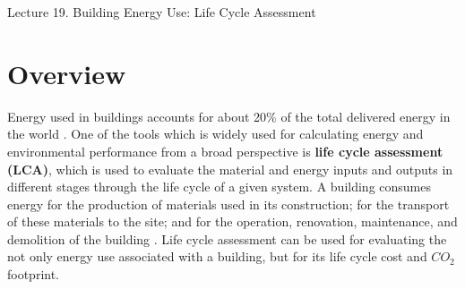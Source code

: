 \documentclass[10pt]{article}
\begin{document}
   \noindent
   \begin{center}

   \hrulefill
   
   \vspace{5pt}
   
   \vspace{0pt}
   
   {\Large \hfill  Lecture 19.  Building Energy Use: Life Cycle Assessment}
   \vspace{5pt}



   \hrulefill
   \end{center}

{}


\section{Overview} %
Energy used in buildings accounts for about 20\%  of the total delivered energy in the world \cite{ODE2016}. One of the tools which is widely used for calculating energy and environmental performance from a broad perspective is \textbf{life cycle assessment (LCA)}, which is used to evaluate the material and energy inputs and outputs in different stages through the life cycle of a given system. A building consumes energy for the production of materials used in its construction; for the transport of these materials to the site; and for the operation, renovation, maintenance, and demolition of the building \cite{cabeza2014life}. Life cycle assessment can be used for evaluating the not only energy use associated with a building, but for its life cycle cost and $CO_2$ footprint. %
\end{document}

